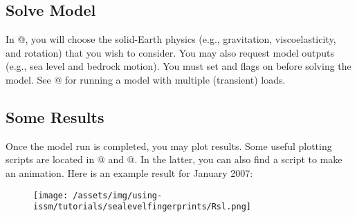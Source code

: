\subsection{Solve Model} %
In @, you will choose the solid-Earth physics (e.g., gravitation, viscoelasticity, and
rotation) that you wish to consider. You may also request model outputs (e.g., sea level and bedrock
motion). You must set \verb@masstransport@ and \verb@slc@ flags on before solving the \verb@transient@
model. See @ for running a model with multiple (transient) loads.
\subsection{Some Results} %
Once the model run is completed, you may plot results. Some useful plotting scripts are located in
@ and @. In the latter, you can also find a script to make an animation.
Here is an example result for January 2007:
\begin{figure}[H]
	\begin{center}
		\texttt{[image: /assets/img/using-issm/tutorials/sealevelfingerprints/Rsl.png]}
	\end{center}
\end{figure}


